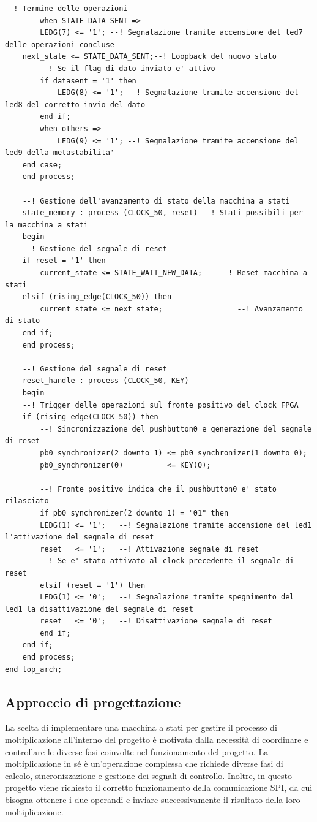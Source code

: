 \documentclass[titlepage]{report}
\begin{document}
\begin{lstlisting}[caption={Top level implementato per la nostra architettura}, label={lst:mul16_process}]
		--! Termine delle operazioni
		when STATE_DATA_SENT =>
		LEDG(7) <= '1'; --! Segnalazione tramite accensione del led7 delle operazioni concluse
	next_state <= STATE_DATA_SENT;--! Loopback del nuovo stato
		--! Se il flag di dato inviato e' attivo
		if datasent = '1' then
			LEDG(8) <= '1'; --! Segnalazione tramite accensione del led8 del corretto invio del dato
		end if;
		when others =>
			LEDG(9) <= '1'; --! Segnalazione tramite accensione del led9 della metastabilita'
	end case;
	end process;

	--! Gestione dell'avanzamento di stato della macchina a stati
	state_memory : process (CLOCK_50, reset) --! Stati possibili per la macchina a stati
	begin
	--! Gestione del segnale di reset
	if reset = '1' then
		current_state <= STATE_WAIT_NEW_DATA;    --! Reset macchina a stati
	elsif (rising_edge(CLOCK_50)) then
		current_state <= next_state;			     --! Avanzamento di stato
	end if;
	end process;
	
	--! Gestione del segnale di reset
	reset_handle : process (CLOCK_50, KEY)
	begin
	--! Trigger delle operazioni sul fronte positivo del clock FPGA
	if (rising_edge(CLOCK_50)) then
		--! Sincronizzazione del pushbutton0 e generazione del segnale di reset
		pb0_synchronizer(2 downto 1) <= pb0_synchronizer(1 downto 0);
		pb0_synchronizer(0)          <= KEY(0);

		--! Fronte positivo indica che il pushbutton0 e' stato rilasciato
		if pb0_synchronizer(2 downto 1) = "01" then
		LEDG(1) <= '1';   --! Segnalazione tramite accensione del led1 l'attivazione del segnale di reset
		reset   <= '1';   --! Attivazione segnale di reset
		--! Se e' stato attivato al clock precedente il segnale di reset
		elsif (reset = '1') then
		LEDG(1) <= '0';   --! Segnalazione tramite spegnimento del led1 la disattivazione del segnale di reset
		reset   <= '0';   --! Disattivazione segnale di reset
		end if;
	end if;
	end process;
end top_arch;
		\end{lstlisting}
		\subsection{Approccio di progettazione}
		\label{subsec:approccio_progettazione}
			La scelta di implementare una macchina a stati per gestire il processo di moltiplicazione all'interno del progetto è motivata dalla necessità di coordinare e controllare le diverse fasi coinvolte nel funzionamento del progetto. La moltiplicazione in sé è un'operazione complessa che richiede diverse fasi di calcolo, sincronizzazione e gestione dei segnali di controllo. Inoltre, in questo progetto viene richiesto il corretto funzionamento della comunicazione SPI, da cui bisogna ottenere i due operandi e inviare successivamente il risultato della loro moltiplicazione.
\end{document}

